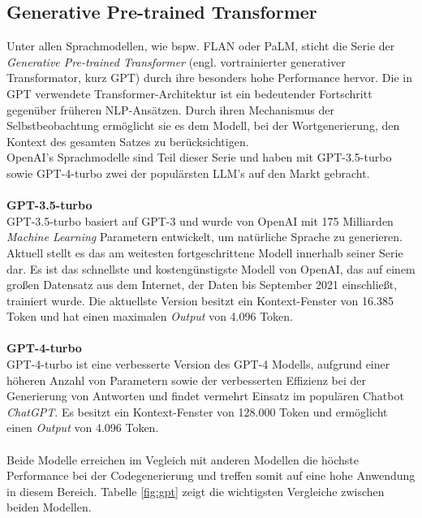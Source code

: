 \subsection{Generative Pre-trained Transformer}
Unter allen Sprachmodellen, wie bspw. FLAN oder PaLM, sticht die Serie der \textit{Generative Pre-trained Transformer} (engl. vortrainierter generativer Transformator, kurz GPT) durch ihre besonders hohe Performance hervor. \cite*{yeComprehensiveCapabilityAnalysis2023} Die in GPT verwendete Transformer-Architektur ist ein bedeutender Fortschritt gegenüber früheren \acs{NLP}-Ansätzen. Durch ihren Mechanismus der Selbstbeobachtung ermöglicht sie es dem Modell, bei der Wortgenerierung, den Kontext des gesamten Satzes zu berücksichtigen. \cite*{yenduriGenerativePretrainedTransformer2023} \\ OpenAI's Sprachmodelle sind Teil dieser Serie und haben mit GPT-3.5-turbo sowie GPT-4-turbo zwei der populärsten LLM's auf den Markt gebracht. \cite*{yaoSurveyLargeLanguage2024}\\\\
\textbf{GPT-3.5-turbo}\\[0.2cm]
GPT-3.5-turbo basiert auf GPT-3 und wurde von OpenAI mit 175 Milliarden \textit{Machine Learning} Parametern entwickelt, um natürliche Sprache zu generieren. Aktuell stellt es das am weitesten fortgeschrittene Modell innerhalb seiner Serie dar. \cite*{yeComprehensiveCapabilityAnalysis2023} Es ist das schnellste und kostengünstigste Modell von OpenAI, das auf einem großen Datensatz aus dem Internet, der Daten bis September 2021 einschließt, trainiert wurde. Die aktuellste Version besitzt ein Kontext-Fenster von 16.385 Token und hat einen maximalen \textit{Output} von 4.096 Token. \cite*{OpenAIPlatform}\\\\
\textbf{GPT-4-turbo}\\[0.2cm]
GPT-4-turbo ist eine verbesserte Version des GPT-4 Modells, aufgrund einer höheren Anzahl von Parametern sowie der verbesserten Effizienz bei der Generierung von Antworten und findet vermehrt Einsatz im populären Chatbot \textit{ChatGPT}. \cite*{shahandashtiEvaluatingEffectivenessGPT42024} Es besitzt ein Kontext-Fenster von 128.000 Token und ermöglicht einen \textit{Output} von 4.096 Token. \cite*{OpenAIPlatform}\\\\
Beide Modelle erreichen im Vegleich mit anderen Modellen die höchste Performance bei der Codegenerierung und treffen somit auf eine hohe Anwendung in diesem Bereich. \cite*{duEvaluatingLargeLanguage2024} Tabelle \ref{fig:gpt} zeigt die wichtigsten Vergleiche zwischen beiden Modellen.



